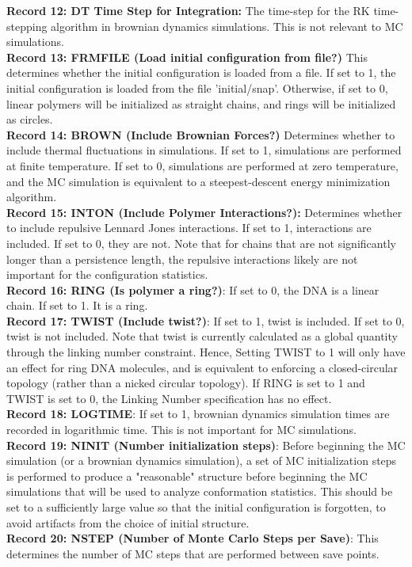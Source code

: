 \documentclass[english]{article}
\begin{document}
\textbf{Record 12: DT Time Step for Integration:} The time-step for the RK time-stepping algorithm in brownian dynamics simulations. This is not relevant to MC simulations.\\
\textbf{Record 13: FRMFILE (Load initial configuration from file?)} This determines whether the initial configuration is loaded from a file. If set to 1, the initial configuration is loaded from the file 'initial/snap'. Otherwise, if set to 0, linear polymers will be initialized as straight chains, and rings will be initialized as circles.\\
\textbf{Record 14: BROWN (Include Brownian Forces?)} Determines whether to include thermal fluctuations in simulations. If set to 1, simulations are performed at finite temperature. If set to 0, simulations are performed at zero temperature, and the MC simulation is equivalent to a steepest-descent energy minimization algorithm.\\
\textbf{Record 15: INTON (Include Polymer Interactions?):} Determines whether to include repulsive Lennard Jones interactions. If set to 1, interactions are included. If set to 0, they are not. Note that for chains that are not significantly longer than a persistence length, the repulsive interactions likely are not important for the configuration statistics.\\
\textbf{Record 16: RING (Is polymer a ring?)}: If set to 0, the DNA is a linear chain. If set to 1. It is a ring.\\
\textbf{Record 17: TWIST (Include twist?)}: If set to 1, twist is included. If set to 0, twist is not included. Note that twist is currently calculated as a global quantity through the linking number constraint. Hence, Setting TWIST to 1 will only have an effect for ring DNA molecules, and is equivalent to enforcing a closed-circular topology (rather than a nicked circular topology). If RING is set to 1 and TWIST is set to 0, the Linking Number specification has no effect.\\
\textbf{Record 18: LOGTIME}: If set to 1, brownian dynamics simulation times are recorded in logarithmic time. This is not important for MC simulations.\\
\textbf{Record 19: NINIT (Number initialization steps)}: Before beginning the MC simulation (or a brownian dynamics simulation), a set of MC initialization steps is performed to produce a "reasonable" structure before beginning the MC simulations that will be used to analyze conformation statistics. This should be set to a sufficiently large value so that the initial configuration is forgotten, to avoid artifacts from the choice of initial structure.\\
\textbf{Record 20: NSTEP (Number of Monte Carlo Steps per Save)}: This determines the number of MC steps that are performed between save points.\\
\end{document}
